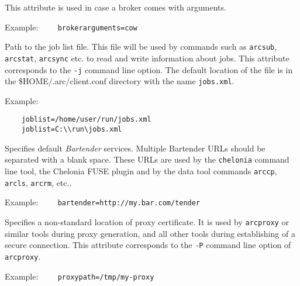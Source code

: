 This attribute is used in case a broker comes with arguments. 

Example:
\verb#    brokerarguments=cow#

{}
\hspace*{0.5cm}
\begin{shaded}
\end{shaded}

Path to the job list file. This file will be used by commands such as \texttt{arcsub}, \texttt{arcstat},
\texttt{arcsync} etc. to read and write information about jobs. This attribute
corresponds to the \verb#-j# command line option. The default
location of the file is in the {\$}HOME/.arc/client.conf directory with the
name \texttt{jobs.xml}.

Example:
\begin{verbatim}
    joblist=/home/user/run/jobs.xml
    joblist=C:\\run\jobs.xml
\end{verbatim}

{}
\hspace*{0.5cm}
\begin{shaded}
\end{shaded}

Specifies default \textit{Bartender} services. Multiple Bartender URLs should
be separated with a blank space.
These URLs are used by the \texttt{chelonia} command line tool, the Chelonia
FUSE plugin and by the data tool commands \texttt{arccp}, \texttt{arcls}, \texttt{arcrm}, etc..

Example:
\verb#    bartender=http://my.bar.com/tender#

{}
\hspace*{0.5cm}
\begin{shaded}
\end{shaded}

Specifies a non-standard location of proxy certificate. It is used by
\texttt{arcproxy} or similar tools during proxy generation, and all other tools
during establishing of a secure connection. This attribute
corresponds to the \verb#-P# command line option of \texttt{arcproxy}.

Example:
\verb#    proxypath=/tmp/my-proxy#

